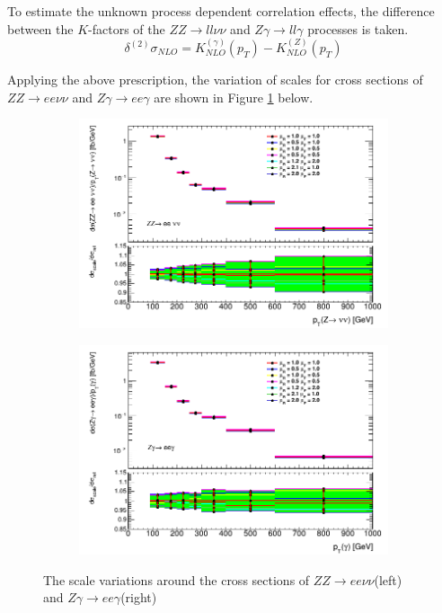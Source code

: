 \documentclass[11pt,a4paper,openright,twoside]{report}
\newcommand{\ZZ}{$ZZ\to ll\nu\nu$ }
\newcommand{\Zg}{$Z\gamma\to ll\gamma$ }
\begin{document}
To estimate the unknown process dependent correlation effects, the difference between the $K$-factors of the \ZZ and \Zg processes is taken.
\begin{equation}
\delta^{(2)} \sigma_{NLO} = K_{NLO}^{(\gamma)}(p_T) - K_{NLO}^{(Z)}(p_T)
\label{eq:K_factor_unc}
\end{equation}

Applying the above prescription, the variation of scales for cross sections of $ZZ\to ee\nu\nu$ and $Z\gamma\to ee\gamma$ are shown in Figure \ref{fig:scale_xsec} below.
\begin{figure}[H]
\centering
	\begin{subfigure}{0.49\textwidth}
		\includegraphics[width=\linewidth]{zz_scale.png}
	\end{subfigure}
	\begin{subfigure}{0.49\textwidth}
		\includegraphics[width=\linewidth]{zg_scale.png}
	\end{subfigure}
	\caption{The scale variations around the cross sections of $ZZ\to ee\nu\nu$(left) and $Z\gamma\to ee\gamma$(right)}
	\label{fig:scale_xsec}
\end{figure}
\end{document}
